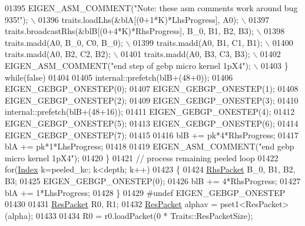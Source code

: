 \begin{DoxyCode}
01395 \textcolor{preprocessor}{              EIGEN\_ASM\_COMMENT("Note: these asm comments work around bug 935!"); \(\backslash\)}
01396 \textcolor{preprocessor}{              traits.loadLhs(&blA[(0+1*K)*LhsProgress], A0);                    \(\backslash\)}
01397 \textcolor{preprocessor}{              traits.broadcastRhs(&blB[(0+4*K)*RhsProgress], B\_0, B1, B2, B3);  \(\backslash\)}
01398 \textcolor{preprocessor}{              traits.madd(A0, B\_0, C0, B\_0);                                    \(\backslash\)}
01399 \textcolor{preprocessor}{              traits.madd(A0, B1,  C1, B1);                                     \(\backslash\)}
01400 \textcolor{preprocessor}{              traits.madd(A0, B2,  C2, B2);                                     \(\backslash\)}
01401 \textcolor{preprocessor}{              traits.madd(A0, B3,  C3, B3);                                     \(\backslash\)}
01402 \textcolor{preprocessor}{              EIGEN\_ASM\_COMMENT("end step of gebp micro kernel 1pX4");          \(\backslash\)}
01403 \textcolor{preprocessor}{            \} while(false)}
01404             
01405             internal::prefetch(blB+(48+0));
01406             EIGEN\_GEBGP\_ONESTEP(0);
01407             EIGEN\_GEBGP\_ONESTEP(1);
01408             EIGEN\_GEBGP\_ONESTEP(2);
01409             EIGEN\_GEBGP\_ONESTEP(3);
01410             internal::prefetch(blB+(48+16));
01411             EIGEN\_GEBGP\_ONESTEP(4);
01412             EIGEN\_GEBGP\_ONESTEP(5);
01413             EIGEN\_GEBGP\_ONESTEP(6);
01414             EIGEN\_GEBGP\_ONESTEP(7);
01415 
01416             blB += pk*4*RhsProgress;
01417             blA += pk*1*LhsProgress;
01418 
01419             EIGEN\_ASM\_COMMENT(\textcolor{stringliteral}{"end gebp micro kernel 1pX4"});
01420           \}
01421           \textcolor{comment}{// process remaining peeled loop}
01422           \textcolor{keywordflow}{for}(\hyperlink{namespace_eigen_a62e77e0933482dafde8fe197d9a2cfde}{Index} k=peeled\_kc; k<depth; k++)
01423           \{
01424             \hyperlink{class_eigen_1_1internal_1_1_tensor_lazy_evaluator_writable}{RhsPacket} B\_0, B1, B2, B3;
01425             EIGEN\_GEBGP\_ONESTEP(0);
01426             blB += 4*RhsProgress;
01427             blA += 1*LhsProgress;
01428           \}
01429 \textcolor{preprocessor}{#undef EIGEN\_GEBGP\_ONESTEP}
01430 
01431           \hyperlink{class_eigen_1_1internal_1_1_tensor_lazy_evaluator_writable}{ResPacket} R0, R1;
01432           \hyperlink{class_eigen_1_1internal_1_1_tensor_lazy_evaluator_writable}{ResPacket} alphav = pset1<ResPacket>(alpha);
01433 
01434           R0 = r0.loadPacket(0 * Traits::ResPacketSize);

\end{DoxyCode}
